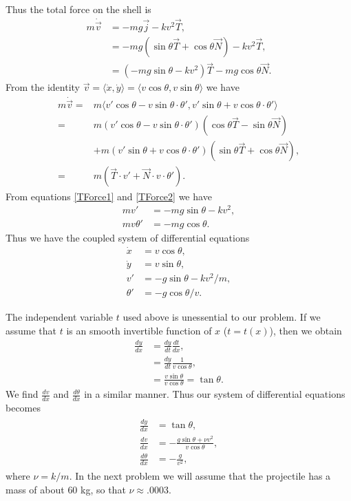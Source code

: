 Thus the total force on the shell is 
\begin{align}
m \dot{\vec{v}} &= -mg \vec{j} - kv^2 \vec{T},\nonumber \\
&= -mg( \sin{\theta} \vec{T} + \cos{\theta} \vec{N} ) - kv^2 \vec{T},\nonumber\\
&= (-mg \sin{\theta} - k v^2 ) \vec{T} - mg \cos{\theta} \vec{N}.\label{TForce1}
\end{align}
From the identity 
$\vec{v} = \langle \dot{x}, \dot{y} \rangle = \langle v \cos{\theta}, v \sin{\theta} \rangle$ 
we have 
\begin{align}
m \dot{\vec{v}} = {} & m\langle v' \cos{\theta} - v\sin{\theta} \cdot \theta' ,v'\sin{\theta} + v\cos{\theta} \cdot \theta' \rangle \nonumber \\
= {} & m(v'\cos{\theta} - v\sin{\theta} \cdot \theta')(\cos{\theta} \vec{T} - \sin{\theta}\vec{N}) \nonumber \\
& + m(v' \sin{\theta} + v\cos{\theta} \cdot \theta')( \sin{\theta} \vec{T} + \cos{\theta} \vec{N}) ,  \nonumber \\
= {} & m(\vec{T} \cdot v' + \vec{N} \cdot v \cdot \theta') . \label{TForce2}
\end{align}
From equations \eqref{TForce1} and \eqref{TForce2} we have 
\begin{align*}
mv' &= -mg\sin{\theta} - k v^2,\\
mv\theta' &= -mg \cos{\theta}.
\end{align*}
Thus we have the coupled system of differential equations
\begin{align}
\dot{x} &= v\cos{\theta}, \nonumber \\
\dot{y} &= v\sin{\theta},\nonumber \\
v' &= -g\sin{\theta} -  k v^2/m,\nonumber \\
\theta' &= -g \cos{\theta}/v. \nonumber
\end{align}


The independent variable $t$ used above is unessential to our problem. If we assume that $t$ is an smooth invertible function of $x$ ($t = t(x)$), then we obtain 
\begin{align*}
\frac{dy}{dx} &= \frac{dy}{dt}\frac{dt}{dx} ,\\
&= \frac{dy}{dt} \frac{1}{v\cos{\theta}}, \\
&= \frac{v \sin{\theta}}{v\cos{\theta}} = \tan{\theta}.
\end{align*}
We find $\frac{dv}{dx}$ and $\frac{d\theta}{dx}$ in a similar manner. 
Thus our system of differential equations becomes 
\begin{align}
	\begin{split}
\frac{dy}{dx} &= \tan {\theta} ,\\
\frac{dv}{dx} &= -\frac{g \sin{\theta} + \nu v^2}{v \cos{\theta}},\\
\frac{d\theta}{dx} &= -\frac{g}{v^2}, \label{cannon_DEs}
	\end{split}
\end{align}
where $\nu = k/m.$ In the next problem we will assume that the projectile has a mass of about $60$ kg, so that $\nu \approx .0003$.



